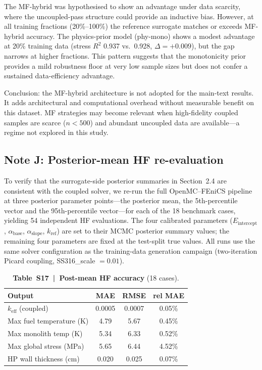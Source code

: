\documentclass[11pt,a4paper]{article}
\newcommand{\keff}{\ensuremath{k_{\mathrm{eff}}}}
\newcommand{\Eint}{\ensuremath{E_{\mathrm{intercept}}}}
\newcommand{\abase}{\ensuremath{\alpha_{\mathrm{base}}}}
\begin{document}
The MF-hybrid was hypothesised to show an advantage under data scarcity,
where the uncoupled-pass structure could provide an inductive bias.
However, at all training fractions (20\%--100\%) the reference surrogate
matches or exceeds MF-hybrid accuracy. The physics-prior model
(phy-mono) shows a modest advantage at 20\% training data (stress $R^2$
0.937 vs.\ 0.928, $\Delta = +0.009$), but the gap narrows at higher
fractions. This pattern suggests that the monotonicity prior provides a
mild robustness floor at very low sample sizes but does not confer a
sustained data-efficiency advantage.

Conclusion: the MF-hybrid architecture is not adopted for the main-text
results. It adds architectural and computational overhead without
measurable benefit on this dataset. MF strategies may become relevant
when high-fidelity coupled samples are scarce ($n < 500$) and abundant
uncoupled data are available---a regime not explored in this study.


\subsection{Note J: Posterior-mean HF re-evaluation}
\label{sec:noteJ}

To verify that the surrogate-side posterior summaries in Section~2.4 are
consistent with the coupled solver, we re-run the full OpenMC--FEniCS
pipeline at three posterior parameter points---the posterior mean, the
5th-percentile vector and the 95th-percentile vector---for each of the
18 benchmark cases, yielding 54 independent HF evaluations. The four
calibrated parameters (\Eint{}, \abase{}, $\alpha_{\mathrm{slope}}$,
$k_{\mathrm{ref}}$) are set to their MCMC posterior summary values; the
remaining four parameters are fixed at the test-split true values. All
runs use the same solver configuration as the training-data generation
campaign (two-iteration Picard coupling, SS316\_scale $= 0.01$).

\begin{table}[htbp]
\centering
\caption{\textbf{Table~S17~|~Post-mean HF accuracy} (18 cases).}
\label{tab:S17}
\smallskip
\small
\begin{tabular}{lccc}
\toprule
Output & MAE & RMSE & rel MAE \\
\midrule
\keff{} (coupled)           & 0.0005 & 0.0007 & 0.05\% \\
Max fuel temperature (K)    & 4.79   & 5.67   & 0.45\% \\
Max monolith temp (K)       & 5.34   & 6.33   & 0.52\% \\
Max global stress (MPa)     & 5.65   & 6.44   & 4.52\% \\
HP wall thickness (cm)      & 0.020  & 0.025  & 0.07\% \\
\bottomrule
\end{tabular}
\end{table}
\end{document}
